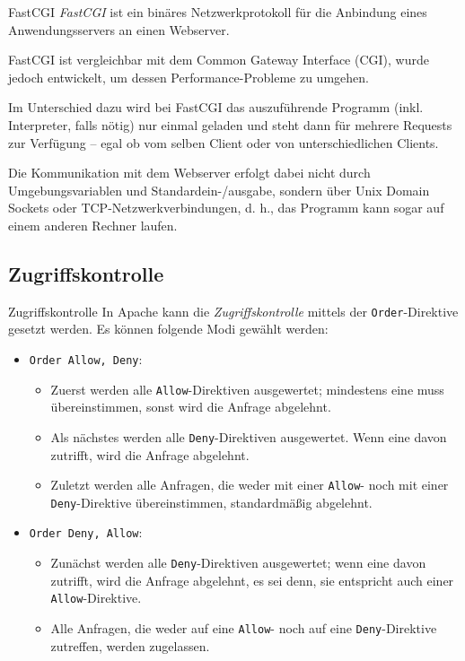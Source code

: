 \begin{defi}{FastCGI}
    \emph{FastCGI} ist ein binäres Netzwerkprotokoll für die Anbindung eines Anwendungsservers an einen Webserver.

    FastCGI ist vergleichbar mit dem Common Gateway Interface (CGI), wurde jedoch entwickelt, um dessen Performance-Probleme zu umgehen.

    Im Unterschied dazu wird bei FastCGI das auszuführende Programm (inkl. Interpreter, falls nötig) nur einmal geladen und steht dann für mehrere Requests zur Verfügung – egal ob vom selben Client oder von unterschiedlichen Clients.

    Die Kommunikation mit dem Webserver erfolgt dabei nicht durch Umgebungsvariablen und Standardein-/ausgabe, sondern über Unix Domain Sockets oder TCP-Netzwerkverbindungen, d. h., das Programm kann sogar auf einem anderen Rechner laufen.
\end{defi}

\subsection{Zugriffskontrolle}

\begin{defi}{Zugriffskontrolle}
    In Apache kann die \emph{Zugriffskontrolle} mittels der \texttt{Order}-Direktive gesetzt werden.
    Es können folgende Modi gewählt werden:
    \begin{itemize}
        \item \texttt{Order Allow, Deny}:
              \begin{itemize}
                  \item Zuerst werden alle \texttt{Allow}-Direktiven ausgewertet; mindestens eine muss übereinstimmen, sonst wird die Anfrage abgelehnt.
                  \item Als nächstes werden alle \texttt{Deny}-Direktiven ausgewertet. Wenn eine davon zutrifft, wird die Anfrage abgelehnt.
                  \item Zuletzt werden alle Anfragen, die weder mit einer \texttt{Allow}- noch mit einer \texttt{Deny}-Direktive übereinstimmen, standardmäßig abgelehnt.
              \end{itemize}
        \item \texttt{Order Deny, Allow}:
              \begin{itemize}
                  \item Zunächst werden alle \texttt{Deny}-Direktiven ausgewertet; wenn eine davon zutrifft, wird die Anfrage abgelehnt, es sei denn, sie entspricht auch einer \texttt{Allow}-Direktive.
                  \item Alle Anfragen, die weder auf eine \texttt{Allow}- noch auf eine \texttt{Deny}-Direktive zutreffen, werden zugelassen.
              \end{itemize}
    \end{itemize}
\end{defi}

